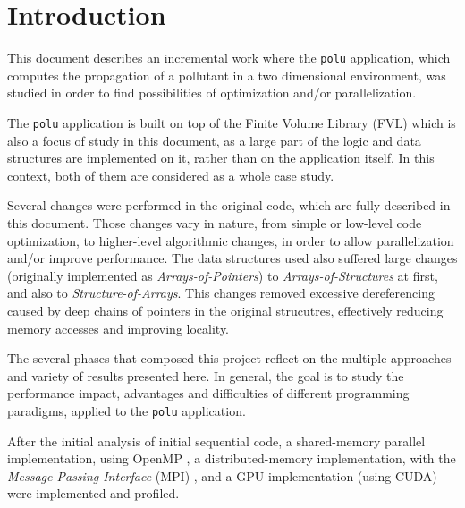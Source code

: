 \section{Introduction}
\label{sec:intro}

This document describes an incremental work where the \texttt{polu} application, which computes the propagation of a pollutant in a two dimensional environment, was studied in order to find possibilities of optimization and/or parallelization.

The \texttt{polu} application is built on top of the Finite Volume Library (FVL) which is also a focus of study in this document, as a large part of the logic and data structures are implemented on it, rather than on the application itself. In this context, both of them are considered as a whole case study.

Several changes were performed in the original code, which are fully described in this document. Those changes vary in nature, from simple or low-level code optimization, to higher-level algorithmic changes, in order to allow parallelization and/or improve performance. The data structures used also suffered large changes (originally implemented as \textit{Arrays-of-Pointers}) to \textit{Arrays-of-Structures} at first, and also to \textit{Structure-of-Arrays}. This changes removed excessive dereferencing caused by deep chains of pointers in the original strucutres, effectively reducing memory accesses and improving locality.

The several phases that composed this project reflect on the multiple approaches and variety of results presented here. In general, the goal is to study the performance impact, advantages and difficulties of different programming paradigms, applied to the \texttt{polu} application. 



After the initial analysis of initial sequential code, a shared-memory parallel implementation, using OpenMP , a distributed-memory implementation, with the \textit{Message Passing Interface} (MPI) , and a GPU implementation (using CUDA)  were implemented and profiled.
